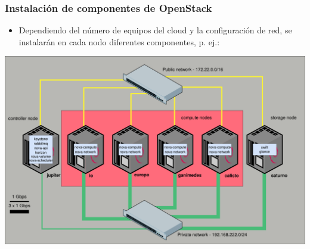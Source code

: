 \documentclass{beamer}
\begin{document}
\begin{frame}
  \frametitle{Instalación de componentes de OpenStack }
  \begin{itemize}
  \item Dependiendo del número de equipos del cloud y la configuración de red,
    se instalarán en cada nodo diferentes componentes, p. ej.:
  \end{itemize}
  \begin{center}
    \includegraphics[width=.8\textwidth]{../img/esquema_red_iesgn}    
  \end{center}
\end{frame}
%   
\end{document}
